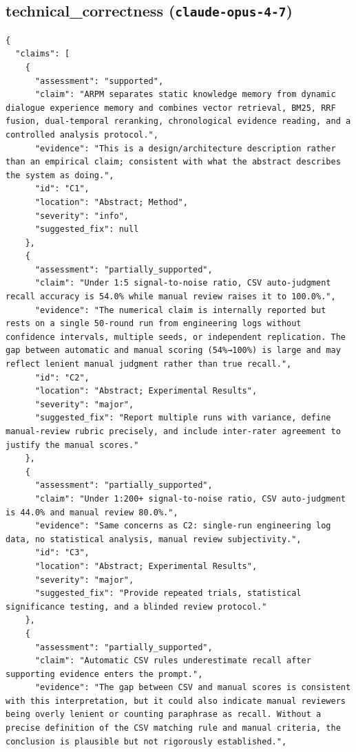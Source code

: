 \documentclass[11pt]{article}
\begin{document}
\subsection*{technical_correctness (\texttt{claude-opus-4-7})}
\begin{verbatim}
{
  "claims": [
    {
      "assessment": "supported",
      "claim": "ARPM separates static knowledge memory from dynamic dialogue experience memory and combines vector retrieval, BM25, RRF fusion, dual-temporal reranking, chronological evidence reading, and a controlled analysis protocol.",
      "evidence": "This is a design/architecture description rather than an empirical claim; consistent with what the abstract describes the system as doing.",
      "id": "C1",
      "location": "Abstract; Method",
      "severity": "info",
      "suggested_fix": null
    },
    {
      "assessment": "partially_supported",
      "claim": "Under 1:5 signal-to-noise ratio, CSV auto-judgment recall accuracy is 54.0% while manual review raises it to 100.0%.",
      "evidence": "The numerical claim is internally reported but rests on a single 50-round run from engineering logs without confidence intervals, multiple seeds, or independent replication. The gap between automatic and manual scoring (54%→100%) is large and may reflect lenient manual judgment rather than true recall.",
      "id": "C2",
      "location": "Abstract; Experimental Results",
      "severity": "major",
      "suggested_fix": "Report multiple runs with variance, define manual-review rubric precisely, and include inter-rater agreement to justify the manual scores."
    },
    {
      "assessment": "partially_supported",
      "claim": "Under 1:200+ signal-to-noise ratio, CSV auto-judgment is 44.0% and manual review 80.0%.",
      "evidence": "Same concerns as C2: single-run engineering log data, no statistical analysis, manual review subjectivity.",
      "id": "C3",
      "location": "Abstract; Experimental Results",
      "severity": "major",
      "suggested_fix": "Provide repeated trials, statistical significance testing, and a blinded review protocol."
    },
    {
      "assessment": "partially_supported",
      "claim": "Automatic CSV rules underestimate recall after supporting evidence enters the prompt.",
      "evidence": "The gap between CSV and manual scores is consistent with this interpretation, but it could also indicate manual reviewers being overly lenient or counting paraphrase as recall. Without a precise definition of the CSV matching rule and manual criteria, the conclusion is plausible but not rigorously established.",

\end{verbatim}
\end{document}
